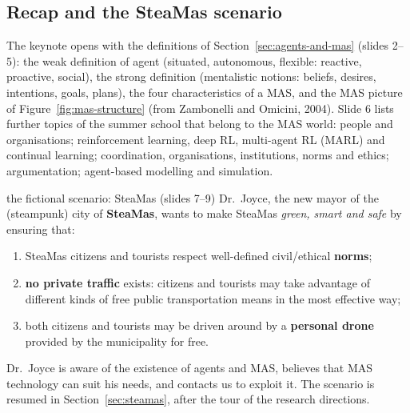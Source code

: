 \subsection{Recap and the SteaMas scenario}
\label{sec:emas-overview}

The keynote opens with the definitions of Section~\ref{sec:agents-and-mas} (slides 2--5):
the weak definition of agent (situated, autonomous, flexible: reactive, proactive, social),
the strong definition (mentalistic notions: beliefs, desires, intentions, goals, plans), the
four characteristics of a MAS, and the MAS picture of Figure~\ref{fig:mas-structure}
(from Zambonelli and Omicini, 2004). Slide 6 lists further topics of the summer school that
belong to the MAS world: people and organisations; reinforcement learning, deep RL,
multi-agent RL (MARL) and continual learning; coordination, organisations, institutions,
norms and ethics; argumentation; agent-based modelling and simulation.

\begin{nbexample}{the fictional scenario: SteaMas (slides 7--9)}
Dr.\ Joyce, the new mayor of the (steampunk) city of \textbf{SteaMas}, wants to make SteaMas
\emph{green, smart and safe} by ensuring that:
\begin{enumerate}[nosep]
  \item SteaMas citizens and tourists respect well-defined civil/ethical \textbf{norms};
  \item \textbf{no private traffic} exists: citizens and tourists may take advantage of
        different kinds of free public transportation means in the most effective way;
  \item both citizens and tourists may be driven around by a \textbf{personal drone}
        provided by the municipality for free.
\end{enumerate}
Dr.\ Joyce is aware of the existence of agents and MAS, believes that MAS technology can
suit his needs, and contacts us to exploit it. The scenario is resumed in
Section~\ref{sec:steamas}, after the tour of the research directions.
\end{nbexample}

